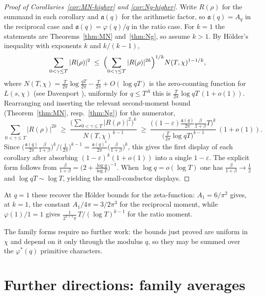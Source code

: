 \documentclass[10pt,a4paper]{amsart}
\numberwithin{equation}{section}
\begin{document}
\begin{proof}[Proof of Corollaries~\textup{\ref{cor:MN-higher}} and \textup{\ref{cor:Ng-higher}}]
Write $R(\rho)$ for the summand in each corollary and $\mathfrak a(q)$ for the arithmetic factor, so $\mathfrak a(q)=A_q$ in the reciprocal case and $\mathfrak a(q)=\varphi(q)/q$ in the ratio case. For $k=1$ the statements are Theorems~\ref{thm:MN} and~\ref{thm:Ng}, so assume $k>1$. By H\"older's inequality with exponents $k$ and $k/(k-1)$,
\[
  \sum_{0<\gamma\le T}|R(\rho)|^{2}
  \;\le\;\Bigl(\sum_{0<\gamma\le T}|R(\rho)|^{2k}\Bigr)^{1/k}N(T,\chi)^{1-1/k},
\]
where $N(T,\chi)=\frac{T}{2\pi}\log\frac{qT}{2\pi}-\frac{T}{2\pi}+O(\log qT)$ is
the zero-counting function for $L(s,\chi)$ (see Davenport \cite[Ch.~16]{Davenport}), uniformly for $q\le T^{A}$ this is $\frac{T}{2\pi}\log qT\,(1+o(1))$. Rearranging and inserting the relevant second-moment bound (Theorem~\ref{thm:MN}, resp.~\ref{thm:Ng}) for
the numerator,
\[
  \sum_{0<\gamma\le T}|R(\rho)|^{2k}
  \;\ge\;\frac{\bigl(\sum_{0<\gamma\le T}|R(\rho)|^{2}\bigr)^{k}}{N(T,\chi)^{\,k-1}}
  \;\ge\;\frac{\bigl((1-\varepsilon)\tfrac{\mathfrak a(q)}{2\pi}\tfrac{\beta}{1+\beta}T\bigr)^{k}}
            {\bigl(\tfrac{T}{2\pi}\log qT\bigr)^{k-1}}\,(1+o(1)).
\]
Since $\bigl(\tfrac{\mathfrak a(q)}{2\pi}\tfrac{\beta}{1+\beta}\bigr)^{k}\big/
\bigl(\tfrac1{2\pi}\bigr)^{k-1}
=\tfrac{\mathfrak a(q)^{k}}{2\pi}\bigl(\tfrac{\beta}{1+\beta}\bigr)^{k}$, this gives the first display of each corollary after absorbing $(1-\varepsilon)^{k}(1+o(1))$ into a single $1-\varepsilon$. The explicit form follows from $\tfrac{\beta}{1+\beta}=\bigl(2+\tfrac{\log q}{\log T}\bigr)^{-1}$. When $\log q=o(\log T)$ one has $\tfrac{\beta}{1+\beta}\to\tfrac12$ and $\log qT\sim\log T$, yielding the small-conductor displays.
\end{proof}


At $q=1$ these recover the H\"older bounds for the zeta-function:
$A_1=6/\pi^2$ gives, at $k=1$, the constant $A_1/4\pi=3/2\pi^3$ for the reciprocal moment, while $\varphi(1)/1=1$ gives $\tfrac{1}{2^{k+1}\pi}\,T/(\log T)^{k-1}$ for the ratio
moment.

The family forms require no further work: the bounds just proved are uniform in $\chi$ and depend on it only through the modulus $q$, so they may be summed over the $\varphi^{*}(q)$ primitive characters.

\section{Further directions: family averages}\label{sect:family}
\end{document}
